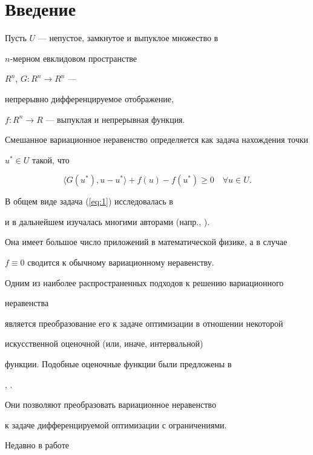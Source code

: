 \label{begin}





\section{Введение}





Пусть $U$ --- непустое, замкнутое и выпуклое множество в


$n$-мерном евклидовом пространстве


$R^{n}$, $G : R^{n} \rightarrow R^{n}$ ---


непрерывно дифференцируемое отображение,


$f : R^{n} \rightarrow R$ --- выпуклая и непрерывная функция.


Смешанное вариационное неравенство определяется как задача нахождения точки


$u^{*}\in U $ такой, что


\begin{equation} \label{eq:1}


\langle G(u^{*}),u-u^{*} \rangle +f(u)-f(u^{*}) \geq 0 \quad \forall u \in U.


\end{equation}


В общем виде задача (\ref{eq:1}) исследовалась в \cite{Bro66}


и в дальнейшем изучалась многими авторами (напр., \cite{BC88}).


Она имеет большое число приложений в математической физике, а в случае 


$f \equiv 0$ сводится к обычному вариационному неравенству.


Одним из наиболее распространенных подходов к решению вариационного 


неравенства 


является преобразование его к задаче оптимизации в отношении некоторой 


искусственной оценочной (или, иначе, интервальной) 


функции. Подобные оценочные функции были предложены в 


\cite{Auc89}, \cite{Fuk92}. 


Они позволяют преобразовать вариационное неравенство 


к задаче дифференцируемой оптимизации с ограничениями.


Недавно в работе \cite{Pen97}


